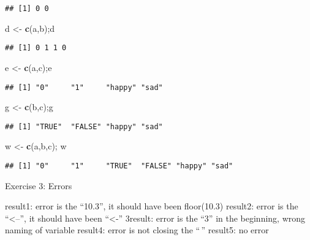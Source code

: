 \documentclass[
]{article}
\newenvironment{Shaded}{\begin{snugshade}}{\end{snugshade}}
\newcommand{\FunctionTok}[1]{\textcolor[rgb]{0.13,0.29,0.53}{\textbf{#1}}}
\newcommand{\NormalTok}[1]{#1}
\newcommand{\OtherTok}[1]{\textcolor[rgb]{0.56,0.35,0.01}{#1}}
\begin{document}
\begin{verbatim}
## [1] 0 0
\end{verbatim}

\begin{Shaded}
\begin{Highlighting}[]
\NormalTok{d }\OtherTok{\textless{}{-}} \FunctionTok{c}\NormalTok{(a,b);d}
\end{Highlighting}
\end{Shaded}

\begin{verbatim}
## [1] 0 1 1 0
\end{verbatim}

\begin{Shaded}
\begin{Highlighting}[]
\NormalTok{e }\OtherTok{\textless{}{-}} \FunctionTok{c}\NormalTok{(a,c);e}
\end{Highlighting}
\end{Shaded}

\begin{verbatim}
## [1] "0"     "1"     "happy" "sad"
\end{verbatim}

\begin{Shaded}
\begin{Highlighting}[]
\NormalTok{g }\OtherTok{\textless{}{-}} \FunctionTok{c}\NormalTok{(b,c);g}
\end{Highlighting}
\end{Shaded}

\begin{verbatim}
## [1] "TRUE"  "FALSE" "happy" "sad"
\end{verbatim}

\begin{Shaded}
\begin{Highlighting}[]
\NormalTok{w }\OtherTok{\textless{}{-}} \FunctionTok{c}\NormalTok{(a,b,c); w}
\end{Highlighting}
\end{Shaded}

\begin{verbatim}
## [1] "0"     "1"     "TRUE"  "FALSE" "happy" "sad"
\end{verbatim}

Exercise 3: Errors

result1: error is the ``10.3'', it should have been floor(10.3) result2:
error is the ``\textless--'', it should have been ``\textless-''
3result: error is the ``3'' in the beginning, wrong naming of variable
result4: error is not closing the ``\,'' result5: no error
\end{document}
